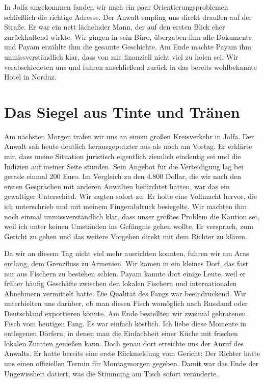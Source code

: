 In Jolfa angekommen fanden wir nach ein paar Orientierungsproblemen schließlich die richtige Adresse. Der Anwalt empfing uns direkt draußen auf der Straße. Er war ein nett lächelnder Mann, der auf den ersten Blick eher zurückhaltend wirkte. Wir gingen in sein Büro, übergaben ihm alle Dokumente und Payam erzählte ihm die gesamte Geschichte. Am Ende machte Payam ihm unmissverständlich klar, dass von mir finanziell nicht viel zu holen sei. Wir verabschiedeten uns und fuhren anschließend zurück in das bereits wohlbekannte Hotel in Norduz.

\chapter*{Das Siegel aus Tinte und Tränen}

Am nächsten Morgen trafen wir uns an einem großen Kreisverkehr in Jolfa. Der Anwalt sah heute deutlich herausgeputzter aus als noch am Vortag. Er erklärte mir, dass meine Situation juristisch eigentlich ziemlich eindeutig sei und die Indizien auf meiner Seite stünden. Sein Angebot für die Verteidigung lag bei gerade einmal 200 Euro. Im Vergleich zu den 4.800 Dollar, die wir nach den ersten Gesprächen mit anderen Anwälten befürchtet hatten, war das ein gewaltiger Unterschied. Wir sagten sofort zu. Er holte eine Vollmacht hervor, die ich unterschrieb und mit meinem Fingerabdruck besiegelte. Wir machten ihm noch einmal unmissverständlich klar, dass unser größtes Problem die Kaution sei, weil ich unter keinen Umständen ins Gefängnis gehen wollte. Er versprach, zum Gericht zu gehen und das weitere Vorgehen direkt mit dem Richter zu klären.

Da wir an diesem Tag nicht viel mehr ausrichten konnten, fuhren wir am Aras entlang, dem Grenzfluss zu Armenien. Wir kamen in ein kleines Dorf, das fast nur aus Fischern zu bestehen schien. Payam kannte dort einige Leute, weil er früher häufig Geschäfte zwischen den lokalen Fischern und internationalen Abnehmern vermittelt hatte. Die Qualität des Fangs war beeindruckend. Wir unterhielten uns darüber, ob man diesen Fisch womöglich nach Russland oder Deutschland exportieren könnte. Am Ende bestellten wir zweimal gebratenen Fisch vom heutigen Fang. Es war einfach köstlich. Ich liebe diese Momente in entlegenen Dörfern, in denen man die Einfachheit einer Küche mit frischen lokalen Zutaten genießen kann. Doch genau dort erreichte uns der Anruf des Anwalts. Er hatte bereits eine erste Rückmeldung vom Gericht: Der Richter hatte uns einen offiziellen Termin für Montagmorgen gegeben. Damit war das Ende der Ungewissheit datiert, was die Stimmung am Tisch sofort veränderte.


